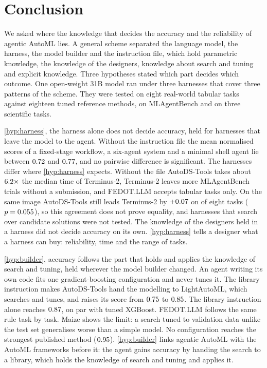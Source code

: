 \section{Conclusion}
\label{sec:conclusion}


We asked where the knowledge that decides the accuracy and the reliability
of agentic AutoML lies. A general scheme separated the language model, the
harness, the model builder and the instruction file, which hold parametric
knowledge, the knowledge of the designers, knowledge about search and tuning
and explicit knowledge. Three hypotheses stated which part decides which
outcome. One open-weight 31B model ran under three
harnesses that cover three patterns of the scheme. They were tested on eight
real-world tabular tasks against eighteen tuned reference methods, on
MLAgentBench and on three scientific tasks.

\ref{hyp:harness}, the harness alone does not decide accuracy, held for
harnesses that leave the model to the agent. Without the instruction file
the mean normalised scores of a fixed-stage workflow, a six-agent system and
a minimal shell agent lie between $0.72$ and $0.77$, and no pairwise
difference is significant. The harnesses differ where \ref{hyp:harness}
expects. Without the file AutoDS-Tools takes about
$6.2\times$ the median time of Terminus-2, Terminus-2 leaves
more MLAgentBench trials without a submission, and FEDOT.LLM accepts
tabular tasks only. On the same image AutoDS-Tools still leads Terminus-2 by
$+0.07$ on \starchAutoDSvsTerminusWins{} of eight
tasks ($p=0.055$), so this agreement does not prove
equality, and harnesses that search over candidate solutions were not
tested.
The knowledge of the designers held in a harness did not decide accuracy on
its own.
\ref{hyp:harness} tells a designer what a harness can buy: reliability, time
and the range of tasks.

\ref{hyp:builder}, accuracy follows the part that holds and applies the
knowledge of search and tuning, held wherever the model builder changed. An agent writing its own code fits one
gradient-boosting configuration and never tunes it. The library instruction
makes AutoDS-Tools hand the modelling to LightAutoML, which searches and
tunes, and raises its score from $0.75$ to $0.85$. The library
instruction alone reaches $0.87$, on par with tuned XGBoost. FEDOT.LLM
follows the same rule task by task. Maize shows the limit: a search tuned to
validation data unlike the test set generalises worse than a simple model. No
configuration reaches the strongest published method ($0.95$).
\ref{hyp:builder} links agentic AutoML with the AutoML frameworks before it:
the agent gains accuracy by handing the search to a library, which holds
the knowledge of search and tuning and applies it.

